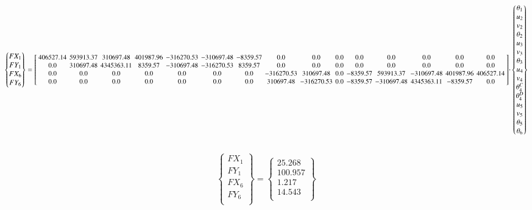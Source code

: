 \documentclass[a4paper]{article}
\begin{document}
\begin{equation}
    \begin{Bmatrix}
        FX_1\\
        FY_1\\
        FX_6\\
        FY_6\\
    \end{Bmatrix} = 
    \arraycolsep=2 pt 
    {\small
     \left[\begin{array}{ccccccccccccccc}
     406527.14 & 593913.37 & 310697.48 & 401987.96 & -316270.53 & -310697.48 & -8359.57 & 0.0 & 0.0 & 0.0 & 0.0 & 0.0 & 0.0 & 0.0 & 0.0\\
     0.0 & 310697.48 & 4345363.11 & 8359.57 & -310697.48 & -316270.53 & 8359.57 & 0.0 & 0.0 & 0.0 & 0.0 & 0.0 & 0.0 & 0.0 & 0.0\\
     0.0 & 0.0 & 0.0 & 0.0 & 0.0 & 0.0 & 0.0 & -316270.53 & 310697.48 & 0.0 & -8359.57 & 593913.37 & -310697.48 & 401987.96 & 406527.14\\
     0.0 & 0.0 & 0.0 & 0.0 & 0.0 & 0.0 & 0.0 & 310697.48 & -316270.53 & 0.0 & -8359.57 & -310697.48 & 4345363.11 & -8359.57 & 0.0
     \end{array}\right] 
     }
     {\cdot} 
    \begin{Bmatrix}
        \theta_1\\
        u_2\\
        v_2\\
        \theta_2\\
        u_3\\
        v_3\\
        \theta_3\\
        u_4\\
        v_4\\
        \theta_4^C\\
        \theta_4^D\\
        u_5\\
        v_5\\
        \theta_5\\
        \theta_6\\
    \end{Bmatrix}
\end{equation}
\\
\begin{equation}
    \begin{Bmatrix}
        FX_1\\
        FY_1\\
        FX_6\\
        FY_6\\
    \end{Bmatrix} = 
        \begin{Bmatrix}
        25.268\\
        100.957\\
        1.217\\
        14.543\\
    \end{Bmatrix}
\end{equation}
\\
\end{document}

